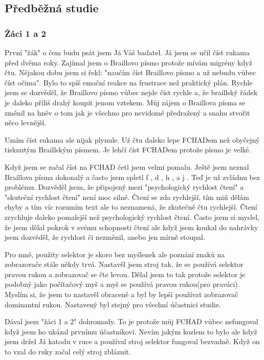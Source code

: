 \subsection{Předběžná studie}

\subsubsection{Žáci 1 a 2}

První "žák" o čem budu psát jsem Já Váš badatel.  Já jsem se učil číst rukama před dvěma roky. Zajímal jsem o Braillovo písmo protože mívám migrény když čtu.  Nějakou dobu jsem si řekl: "naučím číst Braillovo písmo a už nebudu vůbec číst očima".  Bylo to spíš emoční reakce na frustrace než praktický plán.  Rychle jsem se dozvěděl, že Braillovo písmo vůbec nejde číst rychle a, že braillský řádek je daleko příliš drahý koupit jenom vztekem.  Můj zájem o Braillova písma se změnil na hněv o tom jak je všechno pro nevidomé předražený a snahu stvořit něco levnější.

Umím číst rukama ale nijak plynule.  Už čtu daleko lepe FCHADem než obyčejný tisknutým Braillským písmem.  Je lehčí číst FCHADem protože písmo je velké.

Když jsem se začal číst na FCHAD četl jsem velmi pomalu.  Ještě jsem neznal Braillova písma dokonalý a často jsem spletl f , d , h , a j . Teď je už zvládnu bez problému.  Dozvěděl jsem, že připojený mezi "psychologický rychlost čtení" a "skuteční rychlost čtení" není moc silné.  Čtení se zda rychlejší, tím miň dělám chyby a tím víc rozumím text ale to neznamená, že zkutečně čtu rychlejší.  Čtení zrychluje daleko pomalejší než psychologický rychlost čtení.  Často jsem si myslel, že jsem dělal pokrok v svému schopnosti čtení ale když jsem koukal do nahrávky jsem dozvěděl, že rychlost či nezměnil, anebo jen mírně stoupal.

Pro mně, použity selektor je skoro bez myšlenek ale poznání znaků na zobrazovače stále někdy trvá.  Nastavěl jsem stroj tak, že se používá selektor pravou rukou a zobrazovač se čte levou. Dělal jsem to tak protože selektor je podobný jako počítačový myš a myš se používá pravou rukou(pro praváci).  Myslím si, že jsem to nastavěl obraceně a byl by lepší používat zobrazovač dominantní rukou.  Nastavený byl stejný pro všechní účastnici studie.

Dával jsem "žáci 1 a 2" dohromady.  To je protože můj FCHAD vůbec nefungoval když jsem ho ukázal prvnímu účastníkovi. Nevím jakým kozlem to bylo ale když jsem držel Já katodu v ruce a používal stroj selektor fungoval bezvadně. Když on to vzal do ruky začal celý stroj zbláznit.


